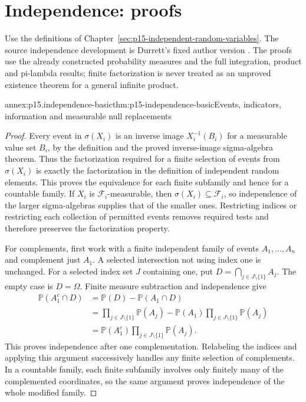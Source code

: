 \section{Independence: proofs}
\label{sec:annex-p15-independent-random-variables}

Use the definitions of Chapter~\ref{sec:p15-independent-random-variables}.
The source independence development is Durrett's fixed author version
\cite[pp.~43--49]{DurrettPTEAuthor2019}. The proofs use the already
constructed probability measures and the full integration, product and
pi-lambda results; finite factorization is never treated as an unproved
existence theorem for a general infinite product.

\begin{annexitem}{annex:p15.independence-basic}{thm:p15-independence-basic}{Events, indicators, information and measurable null replacements}
\begin{proof}
Every event in \(\sigma(X_i)\) is an inverse image
\(X_i^{-1}(B_i)\) for a measurable value set \(B_i\), by the
definition and the proved inverse-image sigma-algebra theorem. Thus
the factorization required for a finite selection of events from
\(\sigma(X_i)\) is exactly the factorization in the definition
of independent random elements. This proves the equivalence for each
finite subfamily and hence for a countable family. If \(X_i\) is
\(\mathcal F_i\)-measurable, then \(\sigma(X_i)\subseteq\mathcal F_i\),
so independence of the larger sigma-algebras supplies that of the
smaller ones. Restricting indices or restricting each collection of
permitted events removes required tests and therefore preserves the
factorization property.

For complements, first work with a finite independent family of events
\(A_1,\ldots,A_n\) and complement just \(A_1\). A selected
intersection not using index one is unchanged. For a selected index
set \(J\) containing one, put
\(D=\bigcap_{j\in J\setminus\{1\}}A_j\). The empty case is
\(D=\Omega\). Finite measure subtraction and independence give
\[
 \begin{aligned}
 \mathbb P(A_1^c\cap D)
   &=\mathbb P(D)-\mathbb P(A_1\cap D)\\
   &=\prod_{j\in J\setminus\{1\}}\mathbb P(A_j)
       -\mathbb P(A_1)\prod_{j\in J\setminus\{1\}}\mathbb P(A_j)\\
   &=\mathbb P(A_1^c)
                      \prod_{j\in J\setminus\{1\}}\mathbb P(A_j).
 \end{aligned}
\]
This proves independence after one complementation. Relabeling the
indices and applying this argument successively handles any finite
selection of complements. In a countable family, each finite subfamily
involves only finitely many of the complemented coordinates, so the
same argument proves independence of the whole modified family.


\end{proof}
\end{annexitem}
